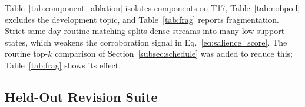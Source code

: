 \documentclass[journal]{IEEEtran}
\begin{document}
\begin{table}[t]
\centering
\caption{Paired comparisons of Dual-Scale against baselines (difference of topic means; Wilcoxon signed-rank on topic scores, Holm-adjusted within the table; no test is computed for $n<5$).}
\label{tab:paired}
\renewcommand{\arraystretch}{1.1}
\resizebox{\columnwidth}{!}{}
\end{table}

\begin{table}[t]
\centering
\caption{T17 component ablation (mean $\pm$ std over $9$ topics).}
\label{tab:component_ablation}
\renewcommand{\arraystretch}{1.1}
\resizebox{\columnwidth}{!}{}
\end{table}

\begin{table}[t]
\centering
\caption{State fragmentation: total emitted states, mean support $c_k$, and states per reference date.}
\label{tab:frag}
\renewcommand{\arraystretch}{1.1}
\resizebox{\columnwidth}{!}{}
\end{table}

\begin{table}[t]
\centering
\caption{T17 without the development topic \texttt{bpoil} ($n=8$; mean over topics).}
\label{tab:nobpoil}
\renewcommand{\arraystretch}{1.1}
\resizebox{\columnwidth}{!}{}
\end{table}

Table~\ref{tab:component_ablation} isolates components on T17, Table~\ref{tab:nobpoil} excludes the development topic, and Table~\ref{tab:frag} reports fragmentation. Strict same-day routine matching splits dense streams into many low-support states, which weakens the corroboration signal in Eq.~\eqref{eq:salience_score}. The routine top-$k$ comparison of Section~\ref{subsec:schedule} was added to reduce this; Table~\ref{tab:frag} shows its effect.


\subsection{Held-Out Revision Suite}
\label{subsec:heldout_results}

\begin{table}[t]
\centering
\caption{Held-out suite: state-level resolution on positive cases (RRA with Wilson $95\%$ interval and counts), stale-fact leakage, negative-control pass rate and false-retraction rate, and timeline-level RRA.}
\label{tab:heldout}
\renewcommand{\arraystretch}{1.12}
\resizebox{\textwidth}{!}{}
\end{table}
\end{document}
